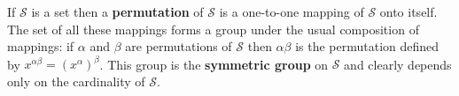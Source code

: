 If $\mathcal{S}$ is a set then a \textbf{permutation} of $\mathcal{S}$ is a one-to-one mapping of $\mathcal{S}$ onto itself. The set of all these mappings forms a group under the usual composition of mappings: if $\alpha$ and $\beta$ are permutations of $\mathcal{S}$ then $\alpha\beta$ is the permutation defined by $x^{\alpha\beta} = (x^\alpha)^\beta$. This group is the \textbf{symmetric group} on $\mathcal{S}$ and clearly depends only on the cardinality of $\mathcal{S}$.
